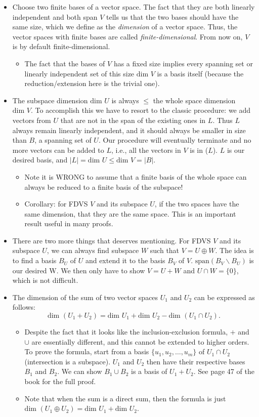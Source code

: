 \documentclass{article}
\newcommand{\s}{\text{span}}
\renewcommand{\d}{\text{dim }}
\begin{document}
\begin{itemize}
    \item Choose two finite bases of a vector space. The fact that they are both linearly independent and both span $V$ tells us that the two bases should have the same size, which we define as the \textit{dimension} of a vector space. Thus, the vector spaces with finite bases are called \textit{finite-dimensional}. From now on, $V$ is by default finite-dimensional.
    \begin{itemize}
        \item The fact that the bases of $V$ has a fixed size implies every spanning set or linearly independent set of this size $\d V$ is a basis itself (because the reduction/extension here is the trivial one).
    \end{itemize}
    \item The subspace dimension $\d U$ is always $\leq$ the whole space dimension $\d V$. To accomplish this we have to resort to the classic procedure: we add vectors from $U$ that are not in the span of the existing ones in $L$. Thus $L$ always remain linearly independent, and it should always be smaller in size than $B$, a spanning set of $U$. Our procedure will eventually terminate and no more vectors can be added to $L$, i.e., all the vectors in $V$ is in \s($L$). $L$ is our desired basis, and $|L| = \d U \leq \d V = |B|$.
    \begin{itemize}
        \item Note it is WRONG to assume that a finite basis of the whole space can always be reduced to a finite basis of the subspace!
        \item Corollary: for FDVS $V$ and its subspace $U$, if the two spaces have the same dimension, that they are the same space. This is an important result useful in many proofs.
    \end{itemize}
    \item There are two more things that deserves mentioning. For FDVS $V$ and its subspace $U$, we can always find subspace $W$ such that $V = U \oplus W$. The idea is to find a basis $B_U$ of $U$ and extend it to the basis $B_V$ of $V$. $\s (B_V \backslash B_U)$ is our desired W. We then only have to show $V = U+W$ and $U \cap W = \{0\}$, which is not difficult.
    \item The dimension of the sum of two vector spaces $U_1$ and $U_2$ can be expressed as follows: $$\d (U_1 + U_2) = \d U_1 + \d U_2 - \d (U_1 \cap U_2).$$
    \begin{itemize}
        \item Despite the fact that it looks like the inclusion-exclusion formula, $+$ and $\cup$ are essentially different, and this cannot be extended to higher orders. To prove the formula, start from a basis $\{u_1,u_2,\dots,u_m\}$ of $U_1 \cap U_2$ (intersection is a subspace). $U_1$ and $U_2$ then have their respective bases $B_1$ and $B_2$. We can show $B_1 \cup B_2$ is a basis of $U_1 + U_2$. See page 47 of the book for the full proof.
        \item Note that when the sum is a direct sum, then the formula is just $\d(U_1 \oplus U_2) = \d U_1 + \d U_2$.
    \end{itemize}
    

\end{itemize}
\end{document}
